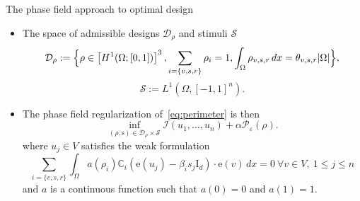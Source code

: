 \documentclass{beamer}
\newcommand{\ee}{\mathrm{e}}
\newcommand{\p}{\rho}
\newcommand{\e}{\varepsilon}
\newcommand{\OO}{\Omega}
\begin{document}
\begin{frame}{The phase field approach  to optimal design}
    \begin{itemize}
        \item The space of admissible designs $\mathcal{D}_{\rho}$ and stimuli $\mathcal{S}$
        \begin{equation*}
            \mathcal{D}_\rho:=\Bigl\{\p \in \left[H^1(\OO;[0,1])\right]^3,
            \sum_{i=\{v,s,r\}}\p_i=1,\int_\OO \rho_{v,s,r}\, dx = \theta_{v,s,r}|\OO|\Bigr\},
        \end{equation*}
        \begin{equation*}\label{eq:defS}
            \mathcal{S}:= L^1\left(\OO,[-1,1]^n\right).
        \end{equation*}
        \item The phase field  regularization of~\eqref{eq:perimeter} is then
        \begin{equation}\label{eq:phaseFieldRegularization}
            \inf_{(\rho,\mathrm{s}) \in \mathcal{D_\rho} \times \mathcal{S}} \mathcal{I}(u_1,\dots,u_n) + \alpha\mathcal{P}_\e(\rho).
        \end{equation}
        where $u_j \in V$ satisfies the weak formulation
        \begin{equation}
            \label{eq:statePFWeak}
            \sum_{i=\{v,s,r\}}\int_\OO a(\p_i)\mathbb{C}_i\left(\ee(u_j)-\beta_i s_j\mathrm{I}_d\right)\cdot \ee(v)\, dx = 0\ \forall v \in V,\  1 \le j \le n
        \end{equation} and $a$ is a continuous function such that $a(0)=0$ and $a(1)=1.$
    \end{itemize}
\end{frame}
\end{document}
